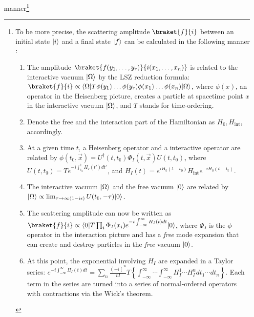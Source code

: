 manner\footnote{
    To be more precise, the scattering amplitude $\braket{f}{i}$
    between an initial state $\lvert i\rangle$
    and a final state $\lvert f\rangle$
    can be calculated in the following
    manner \cite{Weigand}:
    \begin{enumerate}
        \item The amplitude $\braket{f(y_1, \dots, y_r)}{i(x_1, \dots, x_n)}$
            is related to the interactive vacuum
            $\lvert\Omega\rangle$ by the LSZ reduction formula:
            $\braket{f}{i} \propto \bra{\Omega} T \phi(y_1) \dots \phi(y_r) \phi(x_1) \dots \phi(x_n) \ket{\Omega}$,
            where $\phi(x)$, an operator in the Heisenberg picture,
            creates a particle at spacetime point $x$ in the interactive
            vacuum $\lvert\Omega\rangle$,
            and $T$ stands for time-ordering.

        \item Denote the free and the interaction part of the Hamiltonian
            as $H_0, H_\text{int}$, accordingly.

        \item At a given time $t$, a Heisenberg operator and a interactive
            operator are related by
            $\phi(t_0, \vec{x}) = U^\dagger (t, t_0) \Phi_I(t, \vec{x}) U(t, t_0)$,
            where $U(t, t_0) = T e^{-i \int_{t_0}^t H_I(t') d t'}$, and
            $H_I(t) = e^{iH_0(t-t_0)} H_\text{int} e^{-iH_0(t-t_0)}$.

        \item The interactive vacuum $\lvert\Omega\rangle$ and the free vacuum
            $\lvert0\rangle$ are related by
            $\lvert\Omega\rangle \propto \lim_{\tau \rightarrow \infty(1 - i\epsilon)} U(t_0, -\tau)\lvert0\rangle$.

        \item The scattering amplitude can now be written as
            $\braket{f}{i} \propto \bra{0} T \prod_i \Phi_I(x_i) e^{-i \int_{-\infty}^{\infty} H_I(t) dt} \ket{0}$,
            where $\Phi_I$ is the $\phi$ operator in the interaction picture
            and has a \emph{free} mode expansion that can create and destroy
            particles in the \emph{free} vacuum $\lvert0\rangle$.

        \item At this point,
            the exponential involving $H_I$ are expanded in a Taylor series:
            $e^{-i \int_{-\infty}^{\infty} H_I(t) dt} = \sum_n \frac{(-i)^n}{n!} T\left\{
                \int_{-\infty}^{\infty} \cdots \int_{-\infty}^{\infty}
                H_{I}^1 \cdots H_{I}^n d t_1 \cdots d t_n
            \right\}$.
            Each term in the series are turned into a series of
            normal-ordered operators with contractions via the Wick's theorem.


\end{enumerate}}
